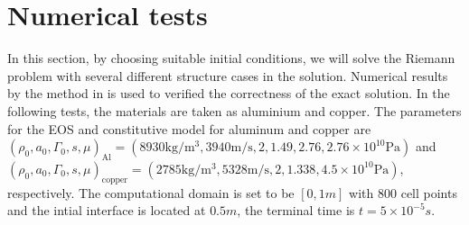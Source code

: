 \documentclass{article}
\numberwithin{equation}{section}
\numberwithin{table}{section}
\begin{document}
\section{Numerical  tests }
In this section, by choosing suitable initial conditions, we will solve the Riemann problem with several different structure cases in the solution.   Numerical results by the method  in \cite{liumulti} is used to verified the correctness of the exact solution. In the following tests, the materials are taken as  aluminium and copper. The parameters for the EOS and constitutive model for aluminum and copper  are
$ (\rho_0, a_0, \Gamma_0, s, \mu)_{\text{Al}} =(8930 \text{kg}/\text{m}^3, 3940 \text{m}/\text{s},2, 1.49, 2.76 ,2.76\times 10^{10} \text{Pa} )$ and   $(\rho_0, a_0, \Gamma_0, s, \mu)_{\text{copper}} =(2785 \text{kg}/\text{m}^3, 5328 \text{m}/\text{s},2, 1.338,4.5\times 10^{10}\text{Pa})$, respectively. The computational domain is set to be $[0,1m]$ with 800 cell points and the intial interface is located at $0.5m$, the terminal time is $t=5\times 10^{-5}s$.
\end{document}

